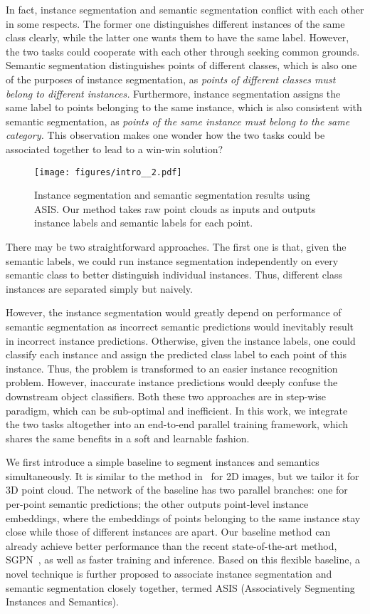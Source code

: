 \documentclass[10pt,twocolumn,letterpaper]{article}
\begin{document}
In fact, instance segmentation and semantic segmentation conflict with each other in some respects.
The former one distinguishes different instances of the same class clearly, while the latter one wants them to have the same label.
However, the two tasks could cooperate with each other through seeking common grounds.
Semantic segmentation distinguishes points of different classes, which is also one of the purposes of instance segmentation, as 
{\it points of different classes must belong to different instances.}
Furthermore, instance segmentation assigns the same label to points belonging to the same instance, which is also consistent with semantic segmentation, as 
{\it points of the same instance must belong to the same category.} 
This observation makes one wonder how the two tasks could be associated together to lead to a win-win solution?

\begin{figure}[!tb]
\texttt{[image: figures/intro\_\_2.pdf]}
\caption{Instance segmentation and semantic segmentation results using ASIS. Our method takes raw point clouds as inputs and outputs instance labels and semantic labels for each point.}
\label{fig:intro}
\end{figure}


There may be two  straightforward approaches. 
The first one is that, given the semantic labels, we could run instance segmentation independently on every semantic class to better distinguish individual instances. Thus,  different class instances are separated simply but naively.


However, the instance segmentation would greatly depend on performance of semantic segmentation as incorrect semantic predictions would inevitably result in incorrect instance predictions. 
Otherwise, given the instance labels, one could classify each instance and assign the predicted class label to each point of this instance. Thus, the problem is transformed to an easier instance recognition problem. However, inaccurate instance predictions would deeply confuse the  downstream object classifiers.
Both these two approaches are in step-wise paradigm, which can be sub-optimal and inefficient.
In this work, we integrate  the two tasks altogether into an end-to-end parallel training framework, which shares the same benefits in a soft and learnable fashion.

We first introduce a simple baseline to segment instances and semantics simultaneously. 
It is similar to the method in~\cite{de2017semantic} for 2D images, but we tailor it for 3D point cloud.
The network of the baseline has two parallel branches: one for per-point semantic predictions; the other outputs point-level instance embeddings, where the embeddings of points belonging to the same instance stay close while those of different instances are apart.
Our baseline method can already achieve better performance than the recent state-of-the-art method, SGPN~\cite{sgpn}, as well as faster training and inference.
Based on this flexible baseline, a novel technique is further proposed to associate instance segmentation and semantic segmentation closely together, termed ASIS (Associatively Segmenting Instances and Semantics).
\end{document}
